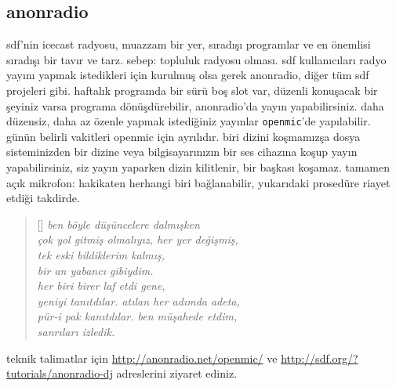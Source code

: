 \documentclass[a4paper, twocolumn, openright]{memoir}
\begin{document}
\subsection{anonradio}
sdf'nin icecast radyosu, muazzam bir yer, sıradışı programlar ve en
önemlisi sıradışı bir tavır ve tarz. sebep: topluluk radyosu olması. sdf
kullanıcıları radyo yayını yapmak istedikleri için kurulmuş olsa gerek
anonradio, diğer tüm sdf projeleri gibi. haftalık programda bir sürü boş
slot var, düzenli konuşacak bir şeyiniz varsa programa dönüşdürebilir,
anonradio'da yayın yapabilirsiniz. daha düzensiz, daha az özenle yapmak
istediğiniz yayınlar \texttt{openmic}'de yapılabilir. günün belirli
vakitleri openmic için ayrılıdır. biri dizini koşmamızşa dosya
sisteminizden bir dizine veya bilgisayarınızın bir ses cihazına koşup
yayın yapabilirsiniz, siz yayın yaparken dizin kilitlenir, bir başkası
koşamaz. tamamen açık mikrofon: hakikaten herhangi biri bağlanabilir,
yukarıdaki prosedüre riayet etdiği takdirde.
\begin{verse}[\versewidth]
\itshape{}
ben böyle düşüncelere dalmışken\\
çok yol gitmiş olmalıyız, her yer değişmiş,\\
tek eski bildiklerim kalmış,\\
bir an yabancı gibiydim.\\
her biri birer laf etdi gene,\\
yeniyi tanıtdılar. atılan her adımda adeta,\\
pür-i pak kanıtdılar. ben müşahede etdim,\\
sanrıları izledik.\\
\end{verse}
teknik talimatlar için \url{http://anonradio.net/openmic/} ve
\url{http://sdf.org/?tutorials/anonradio-dj} adreslerini ziyaret ediniz.
\end{document}
